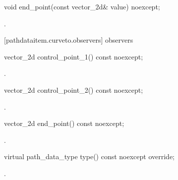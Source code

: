 \begin{itemdecl}
    void end_point(const vector_2d& value) noexcept;
\end{itemdecl}
\begin{itemdescr}
	\pnum
	\postconditions
	.
	
\end{itemdescr}

 [pathdataitem.curveto.observers]{ observers}

\begin{itemdecl}
    vector_2d control_point_1() const noexcept;
\end{itemdecl}
\begin{itemdescr}
	\pnum
	\returns
	.

\end{itemdescr}

\begin{itemdecl}
    vector_2d control_point_2() const noexcept;
\end{itemdecl}
\begin{itemdescr}
	\pnum
	\returns
	.

\end{itemdescr}

\begin{itemdecl}
    vector_2d end_point() const noexcept;
\end{itemdecl}
\begin{itemdescr}
	\pnum
	\returns
	.

\end{itemdescr}

\begin{itemdecl}
    virtual path_data_type type() const noexcept override;
\end{itemdecl}
\begin{itemdescr}
	\pnum
	\returns
	.

\end{itemdescr}
